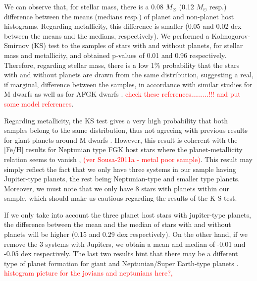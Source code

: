 \documentclass[structabstract]{aa}
\begin{document}
We can observe that, for stellar mass, there is a 0.08 $M_{\odot}$ (0.12 $M_{\odot}$ resp.) difference between the means (medians resp.) of planet and non-planet host histograms. Regarding metallicity, this difference is smaller (0.05 and 0.02 dex between the means and the medians, respectively). We performed a Kolmogorov-Smirnov (KS) test to the samples of stars with and without planets, for stellar mass and metallicity, and obtained p-values of 0.01 and 0.96 respectively. Therefore, regarding stellar mass, there is a low 1\% probability that the stars with and without planets are drawn from the same distribution, suggesting a real, if marginal, difference between the samples, in accordance with similar studies for M dwarfs \citep{Johnson-2007,Johnson-2010} as well as for AFGK dwarfs \citep{Laws-2003,Lovis-2007,Johnson-2010}. \textcolor{red}{check these references.........!!! and put some model references}. %

Regarding metallicity, the KS test gives a very high probability that both samples belong to the same distribution, thus not agreeing with previous results for giant planets around M dwarfs \citep[e.g.][]{Bonfils-2007,Johnson-2009,Johnson-2010,Schlaufman-2010,Rojas-Ayala-2010,Rojas-Ayala-2012,Terrien-2012}. However, this result is coherent with the [Fe/H] results for Neptunian type FGK host stars where the planet-metallicity relation seems to vanish \citep[e.g.][]{Sousa-2008,Bouchy-2009,Sousa-2011b, Mayor-2011}, \textcolor{red}{(ver Sousa-2011a - metal poor sample)}. This result may simply reflect the fact that we only have three systems in our sample having Jupiter-type planets, the rest being Neptunian-type and smaller type planets. Moreover, we must note that we only have 8 stars with planets within our sample, which should make us cautious regarding the results of the K-S test. 

If we only take into account the three planet host stars with jupiter-type planets, the difference between the mean and the median of stars with and without planets will be higher (0.15 and 0.29 dex respectively). On the other hand, if we remove the 3 systems with Jupiters, we obtain a mean and median of -0.01 and -0.05 dex respectively. The last two results hint that there may be a different type of planet formation for giant and Neptunian/Super Earth-type planets \citep[e.g.][more?]{Mordasini-2012}. \textcolor{red}{histogram picture for the jovians and neptunians here?,}
\end{document}
